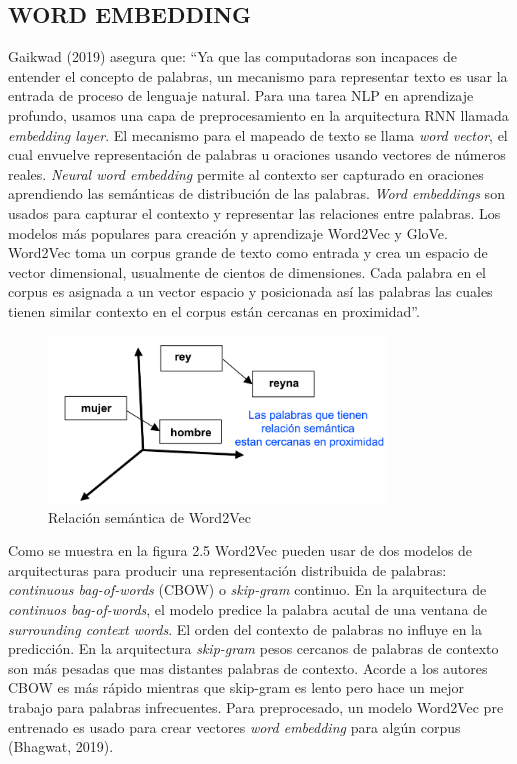 \documentclass[letter, openright, 12pt]{book}
\newcommand*\setcaptioncitation[1]{\def\captioncitation{\textit{Fuente:}~#1}}
\let\captioncitation\relax
\begin{document}
\subsection{WORD EMBEDDING}
Gaikwad (2019) asegura que: “Ya que las computadoras son incapaces de entender el concepto de palabras, un mecanismo para representar texto es usar la entrada de proceso de lenguaje natural. Para una tarea NLP en aprendizaje profundo, usamos una capa de preprocesamiento en la arquitectura RNN llamada \textit{embedding layer}. El mecanismo para el mapeado de texto se llama \textit{word vector}, el cual envuelve representación de palabras u oraciones usando vectores de números reales. \textit{Neural word embedding} permite al contexto ser capturado en oraciones aprendiendo las semánticas de distribución de las palabras. \textit{Word embeddings} son usados para capturar el contexto y representar las relaciones entre palabras. Los modelos más populares para creación y aprendizaje Word2Vec y GloVe. Word2Vec toma un corpus grande de texto como entrada y crea un espacio de vector dimensional, usualmente de cientos de dimensiones. Cada palabra en el corpus es asignada a un vector espacio y posicionada así las palabras las cuales tienen similar contexto en el corpus están cercanas en proximidad”. 

\begin{figure}[H]
\begin{center}
\includegraphics[width=0.8\textwidth]{figura2_5}
\setcaptioncitation{(Len, 2019)}
\caption{Relación semántica de Word2Vec}
\label{tab:figura2_5} 
\end{center}
\end{figure}

Como se muestra en la figura 2.5 Word2Vec pueden usar de dos modelos de arquitecturas para producir una representación distribuida de palabras: \textit{continuous bag-of-words} (CBOW) o \textit{skip-gram} continuo. En la arquitectura de \textit{continuos bag-of-words}, el modelo predice la palabra acutal de una ventana de \textit{surrounding context words}. El orden del contexto de palabras no influye en la predicción. En la arquitectura \textit{skip-gram} pesos cercanos de palabras de contexto son más pesadas que mas distantes palabras de contexto. Acorde a los autores CBOW es más rápido mientras que skip-gram es lento pero hace un mejor trabajo para palabras infrecuentes. Para preprocesado, un modelo Word2Vec pre entrenado es usado para crear vectores \textit{word embedding} para algún corpus (Bhagwat, 2019).
\end{document}
